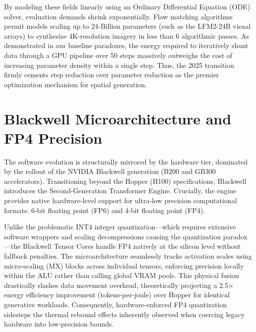 \documentclass[12pt, a4paper]{report}
\begin{document}
By modeling these fields linearly using an Ordinary Differential Equation (ODE) solver, evaluation demands shrink exponentially. Flow matching algorithms permit models scaling up to 24-Billion parameters (such as the LFM2-24B visual arrays) to synthesize 4K-resolution imagery in less than 6 algorithmic passes. As demonstrated in our baseline paradoxes, the energy required to iteratively shunt data through a GPU pipeline over 50 steps massively outweighs the cost of increasing parameter density within a single step. Thus, the 2025 transition firmly cements step reduction over parameter reduction as the premier optimization mechanism for spatial generation.

\section{Blackwell Microarchitecture and FP4 Precision}
The software evolution is structurally mirrored by the hardware tier, dominated by the rollout of the NVIDIA Blackwell generation (B200 and GB300 accelerators). Transitioning beyond the Hopper (H100) specifications, Blackwell introduces the Second-Generation Transformer Engine. Crucially, the engine provides native hardware-level support for ultra-low precision computational formats: 6-bit floating point (FP6) and 4-bit floating point (FP4). 

Unlike the problematic INT4 integer quantization—which requires extensive software wrappers and scaling decompressions causing the quantization paradox—the Blackwell Tensor Cores handle FP4 natively at the silicon level without fallback penalties. The microarchitecture seamlessly tracks activation scales using micro-scaling (MX) blocks across individual tensors, enforcing precision locally within the ALU rather than calling global VRAM pools. This physical fusion drastically slashes data movement overhead, theoretically projecting a 2.5$\times$ energy efficiency improvement (tokens-per-joule) over Hopper for identical generative workloads. Consequently, hardware-enforced FP4 quantization sidesteps the thermal rebound effects inherently observed when coercing legacy hardware into low-precision bounds.
\end{document}

